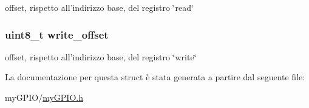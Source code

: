 offset, rispetto all'indirizzo base, del registro \char`\"{}read\char`\"{} \hypertarget{structmy_g_p_i_o__t_abb65e5db6d4ad365a7c48d00e4af1f78}{
\subsubsection[{write\+\_\+offset}]{\setlength{\rightskip}{0pt plus 5cm}uint8\+\_\+t write\+\_\+offset}}\label{structmy_g_p_i_o__t_abb65e5db6d4ad365a7c48d00e4af1f78}
offset, rispetto all'indirizzo base, del registro \char`\"{}write\char`\"{} 

La documentazione per questa struct è stata generata a partire dal seguente file\+:\begin{DoxyCompactItemize}
\item 
my\+G\+P\+I\+O/\hyperlink{my_g_p_i_o_8h}{my\+G\+P\+I\+O.\+h}\end{DoxyCompactItemize}

